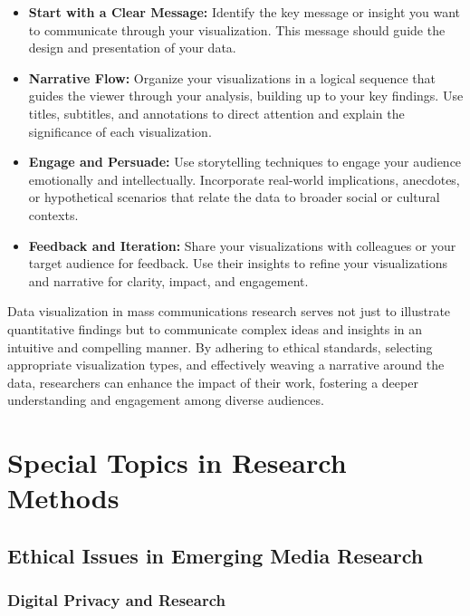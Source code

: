 \documentclass[
]{book}
\begin{document}
\begin{itemize}
\item
  \textbf{Start with a Clear Message:} Identify the key message or insight you want to communicate through your visualization. This message should guide the design and presentation of your data.
\item
  \textbf{Narrative Flow:} Organize your visualizations in a logical sequence that guides the viewer through your analysis, building up to your key findings. Use titles, subtitles, and annotations to direct attention and explain the significance of each visualization.
\item
  \textbf{Engage and Persuade:} Use storytelling techniques to engage your audience emotionally and intellectually. Incorporate real-world implications, anecdotes, or hypothetical scenarios that relate the data to broader social or cultural contexts.
\item
  \textbf{Feedback and Iteration:} Share your visualizations with colleagues or your target audience for feedback. Use their insights to refine your visualizations and narrative for clarity, impact, and engagement.
\end{itemize}

Data visualization in mass communications research serves not just to illustrate quantitative findings but to communicate complex ideas and insights in an intuitive and compelling manner. By adhering to ethical standards, selecting appropriate visualization types, and effectively weaving a narrative around the data, researchers can enhance the impact of their work, fostering a deeper understanding and engagement among diverse audiences.

\chapter{Special Topics in Research Methods}\label{special-topics-in-research-methods}

\section{Ethical Issues in Emerging Media Research}\label{ethical-issues-in-emerging-media-research}

\subsection{Digital Privacy and Research}\label{digital-privacy-and-research}
\end{document}
